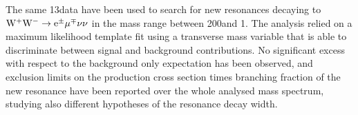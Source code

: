 The same 13\TeV data have been used to search for new resonances decaying to $\rm{W^+W^-}\to e^{\pm} \mu^{\mp}\nu\nu$ in the mass range between 200\GeV and 1\TeV. The analysis relied on a maximum likelihood template fit using a transverse mass variable that is able to discriminate between signal and background contributions. No significant excess with respect to the background only expectation has been observed, and exclusion limits on the production cross section times branching fraction of the new resonance have been reported over the whole analysed mass spectrum, studying also different hypotheses of the resonance decay width.
